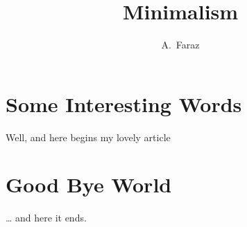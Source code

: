 \documentclass[a4paper,11pt]{article}
\author{A.~Faraz}
\title{Minimalism}
\begin{document}
\maketitle
\tableofcontents
\section{Some Interesting Words}
Well, and here begins my lovely article
\section{Good Bye World}
\ldots{} and here it ends.
\end{document}
